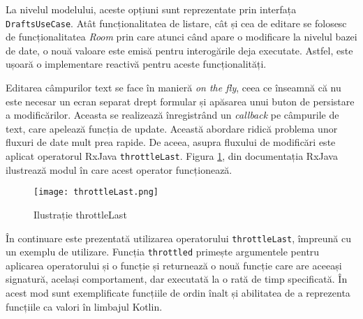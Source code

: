 La nivelul modelului, aceste opțiuni sunt reprezentate prin interfața \texttt{DraftsUseCase}. Atât funcționalitatea de listare, cât și cea de editare se folosesc de funcționalitatea \emph{Room} prin care atunci când apare o modificare la nivelul bazei de date, o nouă valoare este emisă pentru interogările deja executate. Astfel, este ușoară o implementare reactivă pentru aceste funcționalități.



Editarea câmpurilor text se face în manieră \emph{on the fly}, ceea ce înseamnă că nu este necesar un ecran separat drept formular și apăsarea unui buton de persistare a modificărilor. Aceasta se realizează înregistrând un \emph{callback} pe câmpurile de text, care apelează funcția de update. Această abordare ridică problema unor fluxuri de date mult prea rapide. De aceea, asupra fluxului de modificări este aplicat operatorul RxJava \texttt{throttleLast}. Figura \ref{fig:throttle}, din documentația RxJava \cite{ThrottleLast} ilustrează modul în care acest operator funcționează.

\begin{figure}[h]
  \centering
  \texttt{[image: throttleLast.png]}
  \caption{Ilustrație throttleLast}
  \label{fig:throttle}
\end{figure}

În continuare este prezentată utilizarea operatorului \texttt{throttleLast}, împreună cu un exemplu de utilizare. Funcția \texttt{throttled} primește argumentele pentru aplicarea operatorului și o funcție și returnează o nouă funcție care are aceeași signatură, același comportament, dar executată la o rată de timp specificată. În acest mod sunt exemplificate funcțiile de ordin înalt și abilitatea de a reprezenta funcțiile ca valori în limbajul Kotlin.


